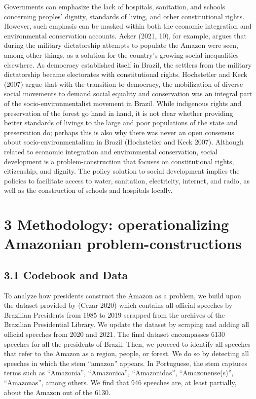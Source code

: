 \documentclass[
  12pt,
]{article}
\begin{document}
Governments can emphasize the lack of hospitals, sanitation, and schools
concerning peoples' dignity, standards of living, and other
constitutional rights. However, such emphasis can be masked within both
the economic integration and environmental conservation accounts. Acker
(2021, 10), for example, argues that during the military dictatorship
attempts to populate the Amazon were seen, among other things, as a
solution for the country's growing social inequalities elsewhere. As
democracy established itself in Brazil, the settlers from the military
dictatorship became electorates with constitutional rights. Hochstetler
and Keck (2007) argue that with the transition to democracy, the
mobilization of diverse social movements to demand social equality and
conservation was an integral part of the socio-environmentalist movement
in Brazil. While indigenous rights and preservation of the forest go
hand in hand, it is not clear whether providing better standards of
livings to the large and poor populations of the state and preservation
do; perhaps this is also why there was never an open consensus about
socio-environmentalism in Brazil (Hochstetler and Keck 2007). Although
related to economic integration and environmental conservation, social
development is a problem-construction that focuses on constitutional
rights, citizenship, and dignity. The policy solution to social
development implies the policies to facilitate access to water,
sanitation, electricity, internet, and radio, as well as the
construction of schools and hospitals locally.

\hypertarget{methodology-operationalizing-amazonian-problem-constructions}{%
\section{3 Methodology: operationalizing Amazonian
problem-constructions}\label{methodology-operationalizing-amazonian-problem-constructions}}

\hypertarget{codebook-and-data}{%
\subsection{3.1 Codebook and Data}\label{codebook-and-data}}

To analyze how presidents construct the Amazon as a problem, we build
upon the dataset provided by (Cezar 2020) which contains all official
speeches by Brazilian Presidents from 1985 to 2019 scrapped from the
archives of the Brazilian Presidential Library. We update the dataset by
scraping and adding all official speeches from 2020 and 2021. The final
dataset encompasses 6130 speeches for all the presidents of Brazil.
Then, we proceed to identify all speeches that refer to the Amazon as a
region, people, or forest. We do so by detecting all speeches in which
the stem ``amazon'' appears. In Portuguese, the stem captures terms such
as ``Amazonia'', ``Amazonica'', ``Amazonidas'', ``Amazonense(s)'',
``Amazonas'', among others. We find that 946 speeches are, at least
partially, about the Amazon out of the 6130.
\end{document}
